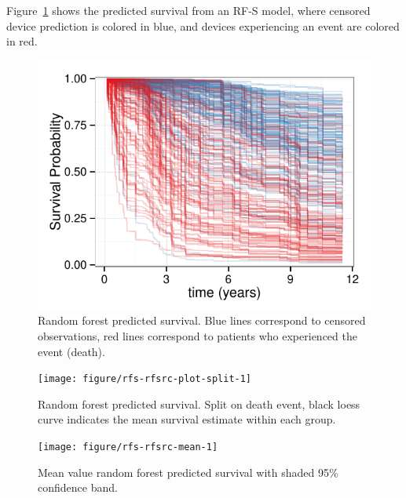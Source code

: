 \documentclass[nojss]{jss}
\begin{document}
Figure~\ref{fig:rfsrc-plot} shows the predicted survival from an RF-S model, where censored device prediction is colored in blue, and devices experiencing an event are colored in red. 
\begin{Schunk}
\begin{figure}[!htpb]

{\centering \includegraphics[width=\maxwidth]{figure/rfs-rfsrc-plot-1} 

}

\caption[Random forest predicted survival]{Random forest predicted survival. Blue lines correspond to censored observations, red lines correspond to patients who experienced the event (death).\label{fig:rfsrc-plot}}
\end{figure}
\end{Schunk}

\begin{Schunk}
\begin{figure}[!htpb]

{\centering \texttt{[image: figure/rfs-rfsrc-plot-split-1]} 

}

\caption[Random forest predicted survival]{Random forest predicted survival. Split on death event, black loess curve indicates the mean survival estimate within each group.\label{fig:rfsrc-plot-split}}
\end{figure}
\end{Schunk}

\begin{Schunk}
\begin{figure}[!htpb]

{\centering \texttt{[image: figure/rfs-rfsrc-mean-1]} 

}

\caption[Mean value random forest predicted survival with shaded 95\% confidence band]{Mean value random forest predicted survival with shaded 95\% confidence band.\label{fig:rfsrc-mean}}
\end{figure}
\end{Schunk}
\end{document}
